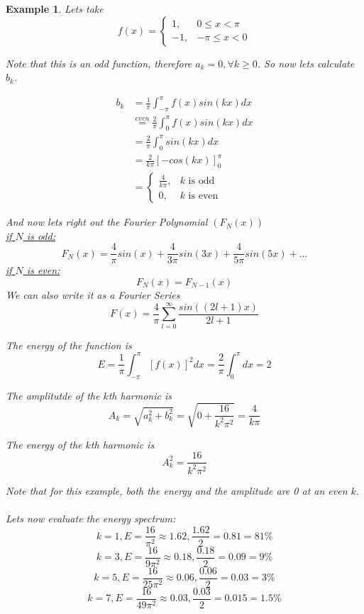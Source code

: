 \documentclass[12pt]{article}
\theoremstyle{plain}
\newtheorem{example}[theorem]{Example}
\theoremstyle{definition}
\begin{document}
\begin{example}
    Lets take
    $$f(x) = \begin{cases}
    1, &0\leq x < \pi\\
    -1, &-\pi \leq x < 0
    \end{cases}$$

    Note that this is an odd function, therefore $a_k = 0, \forall k \geq 0$. So now lets calculate $b_k$.

    \begin{align*}
        b_k &= \frac{1}{\pi} \int^\pi_{-\pi} f(x)sin(kx) dx\\
        &\overset{even}{=} \frac{2}{\pi} \int^\pi_{0} f(x)sin(kx) dx\\
        &= \frac{2}{\pi} \int^\pi_{0} sin(kx) dx\\
        &= \frac{2}{k\pi} [ -cos(kx) ]^\pi_0\\
        &= \begin{cases}
            \frac{4}{k\pi}, &\text{$k$ is odd}\\
            0, &\text{$k$ is even}
        \end{cases}
    \end{align*}

    And now lets right out the Fourier Polynomial $(F_N (x))$\\
    \underline{if $N$ is odd:}
    $$F_N (x) = \frac{4}{\pi}sin(x) + \frac{4}{3\pi}sin(3x) + \frac{4}{5\pi}sin(5x) + ...$$
    \underline{if $N$ is even:}
    $$F_N (x) = F_{N-1} (x)$$
    We can also write it as a Fourier Series
    $$F(x) = \frac{4}{\pi} \sum^\infty_{l=0} \frac{sin((2l+1)x)}{2l+1}$$

    The energy of the function is
    $$E = \frac{1}{\pi} \int^\pi_{-\pi} [f(x)]^2 dx = \frac{2}{\pi} \int^\pi_0 dx = 2$$

    The amplitutde of the $k$th harmonic is
    $$A_k = \sqrt{a_k^2 + b_k^2} = \sqrt{0 + \frac{16}{k^2\pi^2}} = \frac{4}{k\pi}$$

    The energy of the $k$th harmonic is
    $$A_k^2 = \frac{16}{k^2 \pi^2}$$

    Note that for this example, both the energy and the amplitude are 0 at an even $k$.\\
    \\
    Lets now evaluate the energy spectrum:
    $$k=1, E= \frac{16}{\pi^2} \approx 1.62, \frac{1.62}{2}=0.81=81\%$$
    $$k=3, E= \frac{16}{9\pi^2} \approx 0.18, \frac{0.18}{2}=0.09=9\%$$
    $$k=5, E= \frac{16}{25\pi^2} \approx 0.06, \frac{0.06}{2}=0.03=3\%$$
    $$k=7, E= \frac{16}{49\pi^2} \approx 0.03, \frac{0.03}{2}=0.015=1.5\%$$

\end{example}
\end{document}
